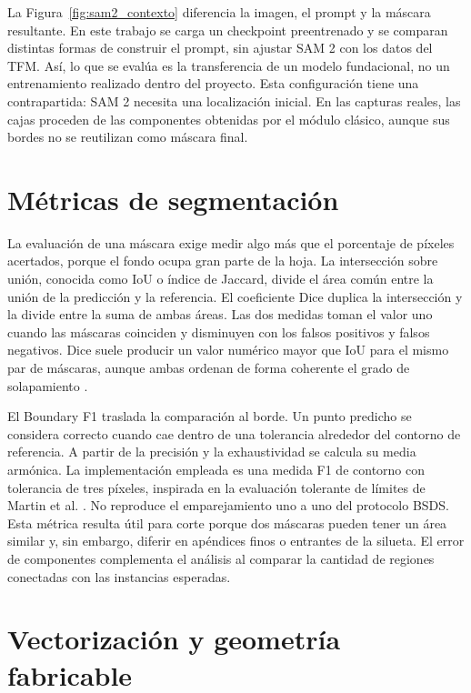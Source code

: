 
La Figura~\ref{fig:sam2_contexto} diferencia la imagen, el prompt y la máscara resultante. En este trabajo se carga un checkpoint preentrenado y se comparan distintas formas de construir el prompt, sin ajustar SAM 2 con los datos del TFM. Así, lo que se evalúa es la transferencia de un modelo fundacional, no un entrenamiento realizado dentro del proyecto. Esta configuración tiene una contrapartida: SAM 2 necesita una localización inicial. En las capturas reales, las cajas proceden de las componentes obtenidas por el módulo clásico, aunque sus bordes no se reutilizan como máscara final.

\section{Métricas de segmentación}

La evaluación de una máscara exige medir algo más que el porcentaje de píxeles acertados, porque el fondo ocupa gran parte de la hoja. La intersección sobre unión, conocida como IoU o índice de Jaccard, divide el área común entre la unión de la predicción y la referencia. El coeficiente Dice duplica la intersección y la divide entre la suma de ambas áreas. Las dos medidas toman el valor uno cuando las máscaras coinciden y disminuyen con los falsos positivos y falsos negativos. Dice suele producir un valor numérico mayor que IoU para el mismo par de máscaras, aunque ambas ordenan de forma coherente el grado de solapamiento \cite{Taha2015}.

El Boundary F1 traslada la comparación al borde. Un punto predicho se considera correcto cuando cae dentro de una tolerancia alrededor del contorno de referencia. A partir de la precisión y la exhaustividad se calcula su media armónica. La implementación empleada es una medida F1 de contorno con tolerancia de tres píxeles, inspirada en la evaluación tolerante de límites de Martin et al. \cite{Martin2004}. No reproduce el emparejamiento uno a uno del protocolo BSDS. Esta métrica resulta útil para corte porque dos máscaras pueden tener un área similar y, sin embargo, diferir en apéndices finos o entrantes de la silueta. El error de componentes complementa el análisis al comparar la cantidad de regiones conectadas con las instancias esperadas.

\section{Vectorización y geometría fabricable}

